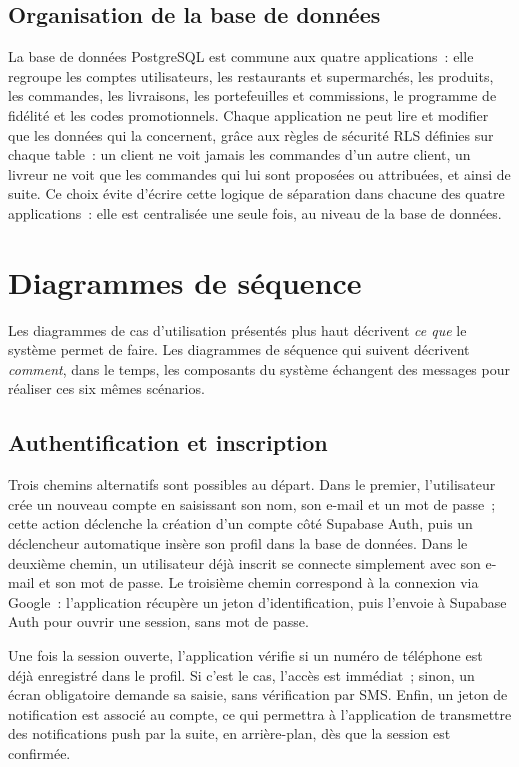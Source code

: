 \documentclass[12pt,fleqn,a4paper]{report}
\begin{document}
\begin{justify}
\subsection{Organisation de la base de données}

La base de données PostgreSQL est commune aux quatre applications~: elle regroupe les comptes utilisateurs, les restaurants et supermarchés, les produits, les commandes, les livraisons, les portefeuilles et commissions, le programme de fidélité et les codes promotionnels. Chaque application ne peut lire et modifier que les données qui la concernent, grâce aux règles de sécurité RLS définies sur chaque table~: un client ne voit jamais les commandes d'un autre client, un livreur ne voit que les commandes qui lui sont proposées ou attribuées, et ainsi de suite. Ce choix évite d'écrire cette logique de séparation dans chacune des quatre applications~: elle est centralisée une seule fois, au niveau de la base de données.

\section{Diagrammes de séquence}
\label{sec:sequences}

Les diagrammes de cas d'utilisation présentés plus haut décrivent \emph{ce que} le système permet de faire. Les diagrammes de séquence qui suivent décrivent \emph{comment}, dans le temps, les composants du système échangent des messages pour réaliser ces six mêmes scénarios.

\subsection{Authentification et inscription}

Trois chemins alternatifs sont possibles au départ. Dans le premier, l'utilisateur crée un nouveau compte en saisissant son nom, son e-mail et un mot de passe~; cette action déclenche la création d'un compte côté Supabase Auth, puis un déclencheur automatique insère son profil dans la base de données. Dans le deuxième chemin, un utilisateur déjà inscrit se connecte simplement avec son e-mail et son mot de passe. Le troisième chemin correspond à la connexion via Google~: l'application récupère un jeton d'identification, puis l'envoie à Supabase Auth pour ouvrir une session, sans mot de passe.

Une fois la session ouverte, l'application vérifie si un numéro de téléphone est déjà enregistré dans le profil. Si c'est le cas, l'accès est immédiat~; sinon, un écran obligatoire demande sa saisie, sans vérification par SMS. Enfin, un jeton de notification est associé au compte, ce qui permettra à l'application de transmettre des notifications push par la suite, en arrière-plan, dès que la session est confirmée.


\end{justify}
\end{document}
